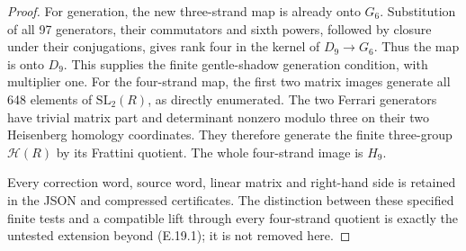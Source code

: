 \begin{proof}
For generation, the new three-strand map
is already onto $G_6$. Substitution of all
97 generators, their commutators and sixth
powers, followed by closure under their
conjugations, gives rank four in the kernel
of $D_9\to G_6$. Thus the map is onto $D_9$.
This supplies the finite gentle-shadow
generation condition, with multiplier one.
For the four-strand map, the first two
matrix images generate all 648 elements
of $\mathrm{SL}_2(R)$, as directly
enumerated. The two Ferrari generators
have trivial matrix part and determinant
nonzero modulo three on their two
Heisenberg homology coordinates. They
therefore generate the finite three-group
$\mathcal H(R)$ by its Frattini quotient.
The whole four-strand image is $H_9$.

Every correction word, source word, linear
matrix and right-hand side is retained
in the JSON and compressed certificates.
The distinction between these specified
finite tests and a compatible lift
through every four-strand quotient is
exactly the untested extension beyond
(E.19.1); it is not removed here.
\end{proof}
